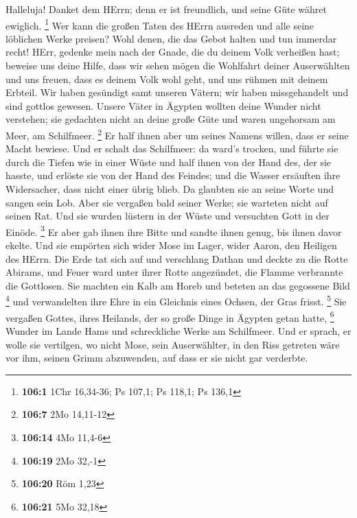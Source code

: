 Halleluja! Danket dem HErrn; denn er ist freundlich, und
seine Güte währet ewiglich. \footnote{\textbf{106:1} 1Chr 16,34-36; Ps
  107,1; Ps 118,1; Ps 136,1}  Wer kann die großen Taten
des HErrn ausreden und alle seine löblichen Werke preisen?
 Wohl denen, die das Gebot halten und tun immerdar recht!
 HErr, gedenke mein nach der Gnade, die du deinem Volk
verheißen hast; beweise uns deine Hilfe,  dass wir sehen
mögen die Wohlfahrt deiner Auserwählten und uns freuen, dass es deinem
Volk wohl geht, und uns rühmen mit deinem Erbteil.  Wir
haben gesündigt samt unseren Vätern; wir haben missgehandelt und sind
gottlos gewesen.  Unsere Väter in Ägypten wollten deine
Wunder nicht verstehen; sie gedachten nicht an deine große Güte und
waren ungehorsam am Meer, am Schilfmeer. \footnote{\textbf{106:7} 2Mo
  14,11-12}  Er half ihnen aber um seines Namens willen,
dass er seine Macht bewiese.  Und er schalt das
Schilfmeer: da ward's trocken, und führte sie durch die Tiefen wie in
einer Wüste  und half ihnen von der Hand des, der sie
hasste, und erlöste sie von der Hand des Feindes;  und
die Wasser ersäuften ihre Widersacher, dass nicht einer übrig blieb.
 Da glaubten sie an seine Worte und sangen sein Lob.
 Aber sie vergaßen bald seiner Werke; sie warteten nicht
auf seinen Rat.  Und sie wurden lüstern in der Wüste und
versuchten Gott in der Einöde. \footnote{\textbf{106:14} 4Mo 11,4-6}
 Er aber gab ihnen ihre Bitte und sandte ihnen genug, bis
ihnen davor ekelte.  Und sie empörten sich wider Mose im
Lager, wider Aaron, den Heiligen des HErrn.  Die Erde tat
sich auf und verschlang Dathan und deckte zu die Rotte Abirams,
 und Feuer ward unter ihrer Rotte angezündet, die Flamme
verbrannte die Gottlosen.  Sie machten ein Kalb am Horeb
und beteten an das gegossene Bild \footnote{\textbf{106:19} 2Mo 32,-1}
 und verwandelten ihre Ehre in ein Gleichnis eines
Ochsen, der Gras frisst. \footnote{\textbf{106:20} Röm 1,23}
 Sie vergaßen Gottes, ihres Heilands, der so große Dinge
in Ägypten getan hatte, \footnote{\textbf{106:21} 5Mo 32,18}
 Wunder im Lande Hams und schreckliche Werke am
Schilfmeer.  Und er sprach, er wolle sie vertilgen, wo
nicht Mose, sein Auserwählter, in den Riss getreten wäre vor ihm, seinen
Grimm abzuwenden, auf dass er sie nicht gar verderbte. 
